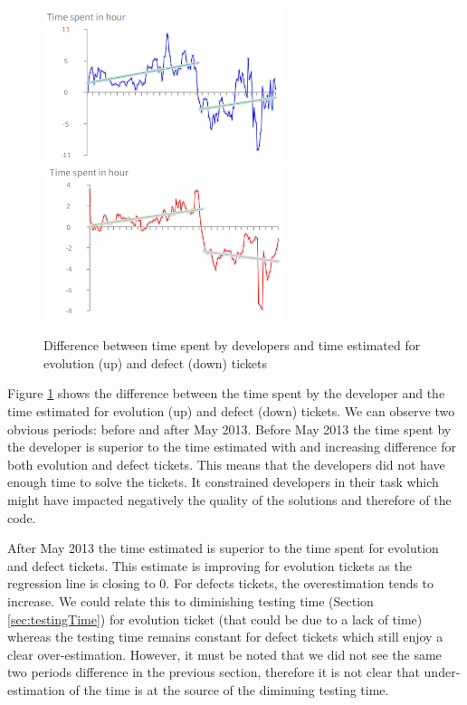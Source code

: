 \documentclass[10pt,conference]{IEEEtran}
\begin{document}

\begin{figure}[htbp]
  \centering
  \includegraphics[width=70mm]{./images/estimateEvol.png}\\
  \includegraphics[width=70mm]{./images/estimateBug.png}
    \caption{Difference between time spent by  developers and time estimated for  evolution (up) and defect (down) tickets}
  \label{fig:devEst}
\end{figure}

Figure \ref{fig:devEst} shows the  difference between the time spent by the developer and the time estimated for evolution (up) and defect (down) tickets.
We can observe two obvious periods: before and after May 2013. 
Before May 2013 the time spent by the developer is superior to the time estimated with and increasing difference for both evolution and defect tickets.
This means that the developers did not have enough time to solve the tickets.
It constrained developers in their task which might have impacted negatively the quality of the solutions and therefore of the code.
 
After May 2013 the time estimated is superior to the time spent for evolution and defect tickets. 
This estimate is improving for evolution tickets as the regression line is closing to 0.
For defects tickets, the overestimation tends to increase.
We could relate this to diminishing testing time (Section \ref{sec:testingTime}) for evolution ticket (that could be due to a lack of time) whereas the testing time remains constant for defect tickets which still enjoy a clear over-estimation.
However, it must be noted that we did not see the same two periods difference in the previous section, therefore it is not clear that under-estimation of the time is at the source of the diminuing testing time.
\end{document}
